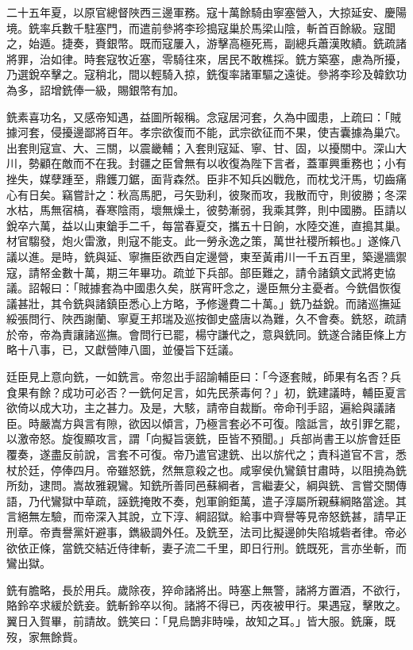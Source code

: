 \begin{pinyinscope}
二十五年夏，以原官總督陜西三邊軍務。寇十萬餘騎由寧塞營入，大掠延安、慶陽境。銑率兵數千駐塞門，而遣前參將李珍搗寇巢於馬梁山陰，斬首百餘級。寇聞之，始遁。捷奏，賚銀幣。既而寇屢入，游擊高極死焉，副總兵蕭漢敗績。銑疏諸將罪，治如律。時套寇牧近塞，零騎往來，居民不敢樵採。銑方築塞，慮為所擾，乃選銳卒擊之。寇稍北，間以輕騎入掠，銑復率諸軍驅之遠徙。參將李珍及韓欽功為多，詔增銑俸一級，賜銀幣有加。

銑素喜功名，又感帝知遇，益圖所報稱。念寇居河套，久為中國患，上疏曰：「賊據河套，侵擾邊鄙將百年。孝宗欲復而不能，武宗欲征而不果，使吉囊據為巢穴。出套則寇宣、大、三關，以震畿輔；入套則寇延、寧、甘、固，以擾關中。深山大川，勢顧在敵而不在我。封疆之臣曾無有以收復為陛下言者，蓋軍興重務也；小有挫失，媒孽踵至，鼎鑊刀鋸，面背森然。臣非不知兵凶戰危，而枕戈汗馬，切齒痛心有日矣。竊嘗計之：秋高馬肥，弓矢勁利，彼聚而攻，我散而守，則彼勝；冬深水枯，馬無宿槁，春寒陰雨，壞無燥土，彼勢漸弱，我乘其弊，則中國勝。臣請以銳卒六萬，益以山東鎗手二千，每當春夏交，攜五十日餉，水陸交進，直搗其巢。材官騶發，炮火雷激，則寇不能支。此一勞永逸之策，萬世社稷所賴也。」遂條八議以進。是時，銑與延、寧撫臣欲西自定邊營，東至黃甫川一千五百里，築邊牆禦寇，請帑金數十萬，期三年畢功。疏並下兵部。部臣難之，請令諸鎮文武將吏協議。詔報曰：「賊據套為中國患久矣，朕宵旰念之，邊臣無分主憂者。今銑倡恢復議甚壯，其令銑與諸鎮臣悉心上方略，予修邊費二十萬。」銑乃益銳。而諸巡撫延綏張問行、陜西謝蘭、寧夏王邦瑞及巡按御史盛唐以為難，久不會奏。銑怒，疏請於帝，帝為責讓諸巡撫。會問行已罷，楊守謙代之，意與銑同。銑遂合諸臣條上方略十八事，已，又獻營陣八圖，並優旨下廷議。

廷臣見上意向銑，一如銑言。帝忽出手詔諭輔臣曰：「今逐套賊，師果有名否？兵食果有餘？成功可必否？一銑何足言，如先民荼毒何？」初，銑建議時，輔臣夏言欲倚以成大功，主之甚力。及是，大駭，請帝自裁斷。帝命刊手詔，遍給與議諸臣。時嚴嵩方與言有隙，欲因以傾言，乃極言套必不可復。陰詆言，故引罪乞罷，以激帝怒。旋復顯攻言，謂「向擬旨褒銑，臣皆不預聞。」兵部尚書王以旂會廷臣覆奏，遂盡反前說，言套不可復。帝乃遣官逮銑、出以旂代之；責科道官不言，悉杖於廷，停俸四月。帝雖怒銑，然無意殺之也。咸寧侯仇鸞鎮甘肅時，以阻撓為銑所劾，逮問。嵩故雅親鸞。知銑所善同邑蘇綱者，言繼妻父，綱與銑、言嘗交關傳語，乃代鸞獄中草疏，誣銑掩敗不奏，剋軍餉鉅萬，遣子淳屬所親蘇綱賂當途。其言絕無左驗，而帝深入其說，立下淳、綱詔獄。給事中齊譽等見帝怒銑甚，請早正刑章。帝責譽黨奸避事，鐫級調外任。及銑至，法司比擬邊帥失陷城砦者律。帝必欲依正條，當銑交結近侍律斬，妻子流二千里，即日行刑。銑既死，言亦坐斬，而鸞出獄。

銑有膽略，長於用兵。歲除夜，猝命諸將出。時塞上無警，諸將方置酒，不欲行，賂鈴卒求緩於銑妾。銑斬鈴卒以徇。諸將不得已，丙夜被甲行。果遇寇，擊敗之。翼日入賀畢，前請故。銑笑曰：「見烏鵲非時噪，故知之耳。」皆大服。銑廉，既歿，家無餘貲。


\end{pinyinscope}
